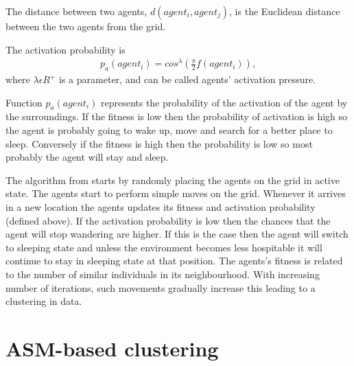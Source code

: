 \begin{remark}
The distance between two agents, $d(agent_i,agent_j)$, is the Euclidean distance between the two agents from the grid.
\end{remark}

\begin{definition}
\label{def:pa}
The activation probability is
\begin{align} 
p_a(agent_i)=cos^\lambda (\frac{\pi}{2}f(agent_i)),
\end{align}
where \begin{math}  \lambda \epsilon R^+  \end{math} is a parameter, and can be called agents' activation pressure.
\end{definition}

\begin{remark}
Function \begin{math} p_a(agent_i)  \end{math} represents the probability of the activation of the agent by the surroundings. If the fitness is low then the probability of activation is high so the agent is probably going to wake up, move and search for a better place to sleep. Conversely if the fitness is high then the probability is low so most probably the agent will stay and sleep.
\end{remark}

The algorithm from \cite{Chen04AnAdaptive} starts by randomly placing the agents on the grid in active state. The agents start to perform simple moves on the grid. Whenever it arrives in a new location the agents updates its fitness and activation probability (defined above). If the activation probability is low then the chances that the agent will stop wandering are higher. If this is the case then the agent will switch to sleeping state and unless the environment becomes less hospitable it will continue to stay in sleeping state at that position. The agents's fitness is related to the number of similar individuals in its neighbourhood. With increasing number of iterations, such movements gradually increase this leading to a clustering in data.


\section{ASM-based clustering}
\label{sec:asmbasedclustering}

